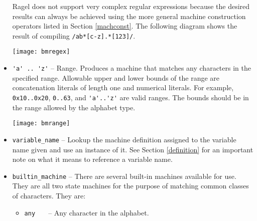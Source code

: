 \documentclass[letterpaper,11pt,oneside]{book}
\begin{document}
\begin{itemize}
Ragel does not support very complex regular expressions because the desired
results can always be achieved using the more general machine construction
operators listed in Section \ref{machconst}. The following diagram shows the
result of compiling \verb|/ab*[c-z].*[123]/|.

\begin{comment}
\begin{verbatim}
main := /ab*[c-z].*[123]/;
\end{verbatim}
\end{comment}

\begin{center}
\texttt{[image: bmregex]}
\end{center}

\item \verb|'a' .. 'z'| -- Range. Produces a machine that matches any
characters in the specified range.  Allowable upper and lower bounds of the
range are concatenation literals of length one and numerical literals.  For
example, \verb|0x10..0x20|, \verb|0..63|, and \verb|'a'..'z'| are valid ranges.
The bounds should be in the range allowed by the alphabet type.

\begin{comment}
\begin{verbatim}
main := 'a' .. 'z';
\end{verbatim}
\end{comment}

\begin{center}
\texttt{[image: bmrange]}
\end{center}


\item \verb|variable_name| -- Lookup the machine definition assigned to the
variable name given and use an instance of it. See Section \ref{definition} for
an important note on what it means to reference a variable name.

\item \verb|builtin_machine| -- There are several built-in machines available
for use. They are all two state machines for the purpose of matching common
classes of characters. They are:

\begin{itemize}

\item \verb|any   | -- Any character in the alphabet.


\end{itemize}
\end{itemize}
\end{document}
